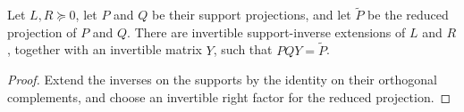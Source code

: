 \begin{lemma}
    \label{thm:reduced_projection_invertible_factor}
    \leanok
    Let $L,R\succeq0$, let $P$ and $Q$ be their support projections, and let
    $\widetilde P$ be the reduced projection of $P$ and $Q$. There are
    invertible support-inverse extensions of $L$ and $R$, together with an
    invertible matrix $Y$, such that $PQY=\widetilde P$.
\end{lemma}

\begin{proof}\leanok
    Extend the inverses on the supports by the identity on their orthogonal
    complements, and choose an invertible right factor for the reduced
    projection.
\end{proof}

